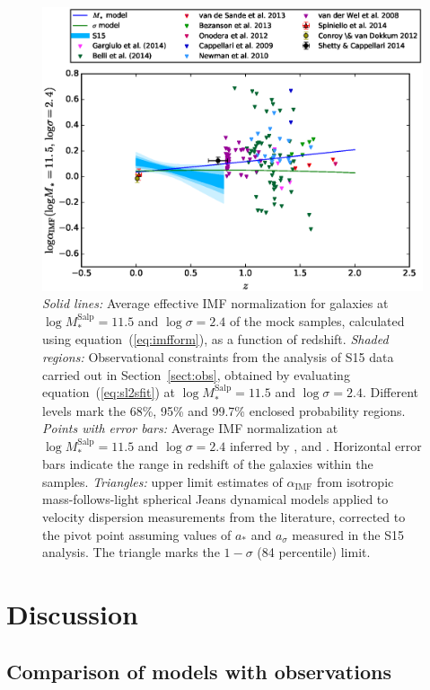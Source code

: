 \documentclass[usenatbib]{mnras}
\def\msalp{M_*^{\mathrm{Salp}}}
\def\aimf{\alpha_{\mathrm{IMF}}}
\def\Sref#1{Section~\ref{#1}\xspace}
\def\Eref#1{equation~(\ref{#1})\xspace}
\begin{document}
\begin{figure}
 \includegraphics[width=\textwidth]{timeevol.eps}
 \caption{ {\em Solid lines:} Average effective IMF
   normalization for galaxies at $\log{\msalp}=11.5$ and
   $\log{\sigma}=2.4$ of the mock samples, calculated using
   \Eref{eq:imfform}, as a function of redshift.  {\em Shaded
     regions:} Observational constraints from the analysis of S15 data
   carried out in \Sref{sect:obs}, obtained by evaluating
   \Eref{eq:sl2sfit} at $\log{\msalp}=11.5$ and $\log{\sigma}=2.4$. Different levels mark the 68\%,
   95\% and 99.7\% enclosed probability regions.  {\em Points with
     error bars:} Average IMF normalization at $\log{\msalp}=11.5$ and
   $\log{\sigma}=2.4$ inferred by \citet{CvD12}, \citet{Spi++14} and
   \citet{S+C14}. Horizontal error bars indicate the range in redshift
   of the galaxies within the samples.  {\em Triangles:}
   upper limit estimates of $\aimf$ from isotropic mass-follows-light spherical
   Jeans dynamical models applied to velocity dispersion measurements
   from the literature, corrected to the pivot point assuming values
   of $a_*$ and $a_\sigma$ measured in the S15 analysis. The triangle 
   marks the $1-\sigma$ (84 percentile) limit.
   }
 \label{fig:bevol}
\end{figure}
%
\section{Discussion}\label{sect:discuss} 


\subsection{Comparison of models with observations}
\end{document}
